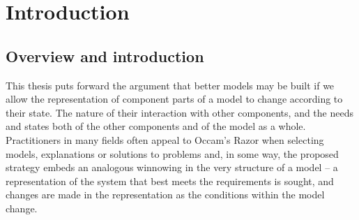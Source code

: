 \titlepg
\signaturepage
\altcopyrightpage
\abswithesis
\ackpage
{}

\tableofcontents  


\chapter[INTRODUCTION]{Introduction}\label{intro}

\section{Overview and introduction}

This thesis puts forward the argument that better models may be built
if we allow the representation of component parts of a model to change
according to their state. The nature of their interaction with other
components, and the needs and states both of the other components and
of the model as a whole. Practitioners in many fields often appeal to
Occam's Razor when selecting models, explanations or solutions to
problems and, in some way, the proposed strategy embeds an analogous
winnowing in the very structure of a model -- a representation of the
system that best meets the requirements is sought, and changes are
made in the representation as the conditions within the model change.

